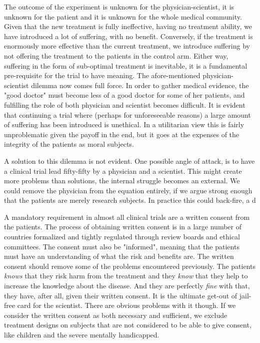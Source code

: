 \documentclass[12p]{article}
\begin{document}

The outcome of the experiment is unknown for the physician-scientist, it is unknown for the patient and it is unknown for the whole medical community.
Given that the new treatment is fully ineffective, having no treatment ability, we have introduced a lot of suffering, with no benefit.
Conversely, if the treatment is enormously more effective than the current treatment, we introduce suffering by not offering the treatment to the patients in the control arm.
Either way, suffering in the form of sub-optimal treatment is inevitable, it is a fundamental pre-requisite for the trial to have meaning.
The afore-mentioned physician-scientist dilemma now comes full force.
In order to gather medical evidence, the "good doctor" must become less of a good doctor for some of her patients, and fulfilling the role of both physician and scientist becomes difficult.
It is evident that continuing a trial where (perhaps for unforeseeable reasons) a large amount of suffering has been introduced is unethical.
In a utilitarian view this is fairly unproblematic given the payoff in the end, but it goes at the expenses of the integrity of the patients as moral subjects.

A solution to this dilemma is not evident.
One possible angle of attack, is to have a clinical trial lead fifty-fifty by a physician and a scientist.
This might create more problems than solutions, the internal struggle becomes an external.
We could remove the physician from the equation entirely, if we argue strong enough that the patients are merely research subjects.
In practice this could back-fire, a d

A mandatory requirement in almost all clinical trials are a written consent from the patients.
The process of obtaining written consent is in a large number of countries formalized and tightly regulated through review boards and ethical committees.
The consent must also be "informed", meaning that the patients must have an understanding of what the risk and benefits are.
The written consent should remove some of the problems encountered previously.
The patients \emph{knows} that they risk harm from the treatment and they \emph{know} that they help to increase the knowledge about the disease.
And they are perfectly \emph{fine} with that, they have, after all, given their written consent. 
It is the ultimate get-out of jail-free card for the scientist.
There are obvious problems with it though.
If we consider the written consent as both necessary and sufficient, we exclude treatment designs on subjects that are not considered to be able to give consent, like children and the severe mentally handicapped.
\end{document}
